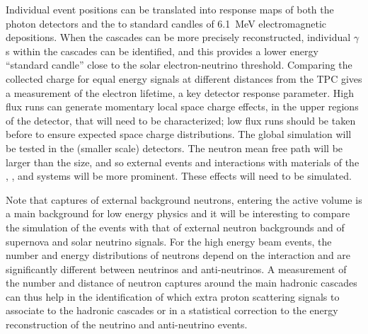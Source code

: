 Individual event positions can be translated into response maps of both the photon detectors and the  to standard candles of 6.1~MeV electromagnetic depositions. When the cascades can be more precisely reconstructed, individual $\gamma$s within the cascades can be identified, and this provides a lower energy ``standard candle'' close to the solar electron-neutrino threshold. Comparing the collected charge for equal energy signals at different distances from the TPC gives a measurement of the electron lifetime, a key detector response parameter. High  flux runs can generate momentary local space charge effects, in the 
upper regions of the detector, that will need to be characterized; low flux runs should be taken before to ensure 
expected space charge distributions.
The global simulation will be tested in the (smaller scale)  detectors. The neutron mean free path will be larger than the  size, and so 
external events and interactions with materials of the , , and  systems will be more prominent. These effects will need to be simulated.

Note that captures of external background neutrons, entering the active volume is a main background for low energy physics and it will be interesting to compare the simulation of the  events with that of external neutron backgrounds and of supernova and solar neutrino signals. For the high energy beam events, the number and energy distributions of neutrons depend on the interaction and are significantly different between neutrinos and anti-neutrinos. A measurement of the number and distance of neutron captures around the main hadronic cascades can thus help in the identification of which extra proton scattering signals to associate to the hadronic cascades or in a statistical correction to the energy reconstruction of the neutrino and anti-neutrino events.



